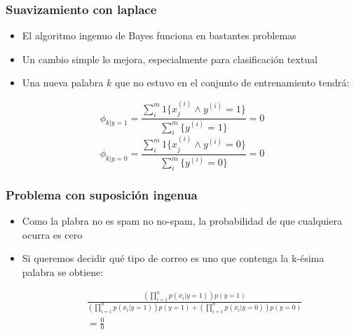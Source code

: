 \documentclass{beamer}
\begin{document}
\begin{frame}
\frametitle{Suavizamiento con laplace}
\begin{itemize}
\item El algoritmo ingenuo de Bayes funciona en bastantes problemas
\item Un cambio simple lo mejora, especialmente para clasificación textual
\item Una nueva palabra $k$ que no estuvo en el conjunto de entrenamiento tendrá:
\end{itemize}
\begin{equation*}
\phi_{k\vert y=1}= \frac{\sum_i^m 1 \lbrace x_j^{(i)} \wedge y^{(i)}=1 \rbrace  }{\sum_i^m  \lbrace  y^{(i)}=1 \rbrace }=0
\end{equation*}
\begin{equation*}
\phi_{k\vert y=0}= \frac{\sum_i^m  1 \lbrace x_j^{(i)} \wedge y^{(i)}=0 \rbrace  }{\sum_i^m  \lbrace  y^{(i)}=0 \rbrace }=0
\end{equation*}

\end{frame}
\begin{frame}
\frametitle{Problema con suposición ingenua}
\begin{itemize}
\item Como la plabra no es spam no no-spam, la probabilidad de que cualquiera ocurra es cero
\item Si queremos decidir qué tipo de correo es uno que contenga la k-ésima palabra se obtiene: 

\begin{equation*}
\begin{split}
&\frac{\left(  \prod_{i=1}^{n} p(x_i\vert y=1) \right)p(y=1) }{\left(  \prod_{i=1}^{n} p(x_i\vert y=1) \right) p(y=1) + \left( \prod_{i=1}^{n} p(x_i\vert y=0) \right) p(y=0) } \\
&= \frac{0}{0}
\end{split}
\end{equation*}  
\end{itemize}

\end{frame}
\end{document}
